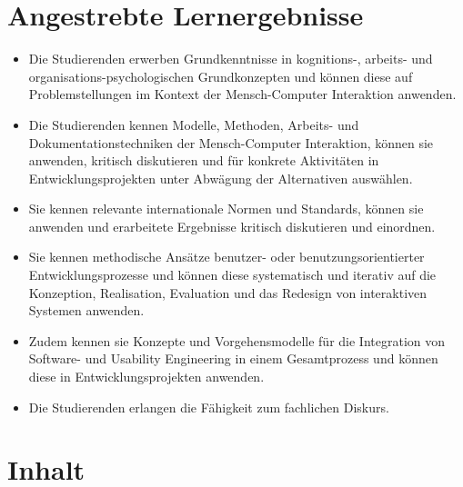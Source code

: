 \hypertarget{angestrebte-lernergebnissepathlabelmi-2017modulbeschreibungen-bachelorba_mensch-computer_interaktion}{%
\section*{Angestrebte
Lernergebnisse\label{/mi-2017/modulbeschreibungen-bachelor/BA_Mensch-Computer_Interaktion}}\label{angestrebte-lernergebnissepathlabelmi-2017modulbeschreibungen-bachelorba_mensch-computer_interaktion}}

\begin{itemize}
\tightlist
\item
  Die Studierenden erwerben Grundkenntnisse in kognitions-, arbeits- und
  organisations-psychologischen Grundkonzepten und können diese auf
  Problemstellungen im Kontext der Mensch-Computer Interaktion anwenden.
\item
  Die Studierenden kennen Modelle, Methoden, Arbeits- und
  Dokumentationstechniken der Mensch-Computer Interaktion, können sie
  anwenden, kritisch diskutieren und für konkrete Aktivitäten in
  Entwicklungsprojekten unter Abwägung der Alternativen auswählen.
\item
  Sie kennen relevante internationale Normen und Standards, können sie
  anwenden und erarbeitete Ergebnisse kritisch diskutieren und
  einordnen.
\item
  Sie kennen methodische Ansätze benutzer- oder benutzungsorientierter
  Entwicklungsprozesse und können diese systematisch und iterativ auf
  die Konzeption, Realisation, Evaluation und das Redesign von
  interaktiven Systemen anwenden.
\item
  Zudem kennen sie Konzepte und Vorgehensmodelle für die Integration von
  Software- und Usability Engineering in einem Gesamtprozess und können
  diese in Entwicklungsprojekten anwenden.
\item
  Die Studierenden erlangen die Fähigkeit zum fachlichen Diskurs.
\end{itemize}

\hypertarget{inhaltpathlabelmi-2017modulbeschreibungen-bachelorba_mensch-computer_interaktion}{%
\section*{Inhalt\label{/mi-2017/modulbeschreibungen-bachelor/BA_Mensch-Computer_Interaktion}}\label{inhaltpathlabelmi-2017modulbeschreibungen-bachelorba_mensch-computer_interaktion}}

